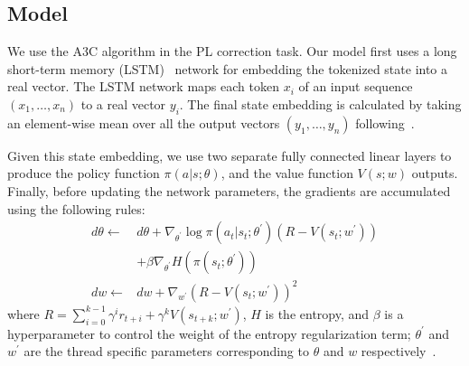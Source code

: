 \documentclass{article}
\begin{document}
\subsection{Model}
We use the A3C algorithm in the PL correction task. 
Our model first uses a long short-term memory (LSTM)~\cite{hochreiter1997long} network for embedding the tokenized state into a real vector. 
The LSTM network maps each token $ x_i $ of an input sequence $ (x_1, \ldots, x_n) $ to a real vector $ y_i $.
The final state embedding is calculated by taking an element-wise mean over all the output vectors $ (y_1, \ldots, y_n) $ following~\cite{narasimhan2015language}.

Given this state embedding, we use two separate fully connected linear layers to produce the policy function $ \pi(a|s; \theta) $, and the value function $ V(s; w) $ outputs.
Finally, before updating the network parameters, the gradients are accumulated using the following rules:
\begin{align*}
d\theta {}\leftarrow{} & d\theta + \nabla_{\theta^\prime} \log \pi(a_t|s_t;\theta^{\prime})(R - V(s_t;w^{\prime}))\\
& + \beta \nabla_{\theta^\prime} H(\pi(s_t;\theta^{\prime}))\\
dw {}\leftarrow{} & dw + \nabla_{w^\prime} (R - V(s_t; w^{\prime}))^2
\end{align*}
where $R = \sum_{i=0}^{k-1}\gamma^{i} r_{t+i} + \gamma^{k} V(s_{t+k}; w^{\prime})$, $ H $ is the entropy, and $ \beta $ is a hyperparameter to control the weight of the entropy regularization term; $ \theta^{\prime} $ and $ w^{\prime} $ are the thread specific parameters corresponding to $ \theta $ and $ w $ respectively~\cite{mnih2016asynchronous}.
\end{document}
